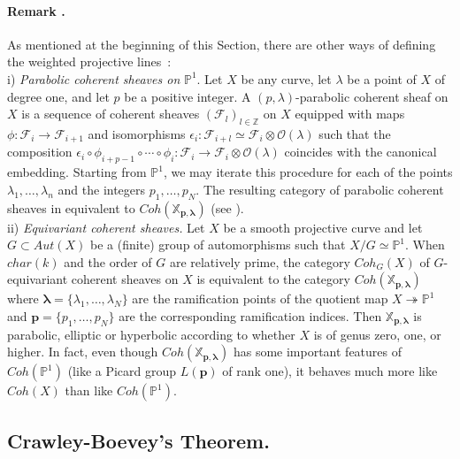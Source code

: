 \documentclass[a4paper,10pt]{amsart}
\def\Z{\mathbb{Z}}
\def\O{\mathcal{O}}
\def\p{\mathbf{p}}
\def\xpl{\mathbb{X}_{\mathbf{p},\boldsymbol{\lambda}}}
\def\llambda{\boldsymbol{\lambda}}
\numberwithin{equation}{section}
\begin{document}
{\paragraph{\textbf{Remark \thetheo.}} As mentioned at the beginning of this Section, there are other ways of defining the weighted projective lines~:\\
i) \textit{Parabolic coherent sheaves on} $\mathbb{P}^1$. Let $X$ be any curve, let $\lambda$ be a point of $X$ of degree one, and let $p$ be a positive integer. A $(p,\lambda)$-parabolic coherent sheaf on $X$ is a sequence of coherent sheaves $(\mathcal{F}_l)_{l \in \Z}$ on $X$ equipped with maps $\phi: \mathcal{F}_i \to \mathcal{F}_{i+1}$ and isomorphisms $\epsilon_i: \mathcal{F}_{i+l} \simeq \mathcal{F}_i \otimes \O(\lambda)$ such that the composition $\epsilon_i \circ \phi_{i+p-1} \circ \cdots \circ \phi_i : \mathcal{F}_i \to \mathcal{F}_i \otimes \O(\lambda)$ coincides with the canonical embedding. Starting from $\mathbb{P}^1$, we may iterate this procedure for each of the points $\lambda_1, \ldots, \lambda_n$ and the integers $p_1, \ldots, p_N$. The resulting category of parabolic coherent sheaves in equivalent to $Coh(\xpl)$ (see \cite{Lenzing1}).\\
ii) \textit{Equivariant coherent sheaves.} Let $X$ be a smooth projective curve and let $G \subset {Aut}(X)$ be a (finite) group of automorphisms such that $X/G \simeq \mathbb{P}^1$. When $char({k})$ and the order of $G$ are relatively prime, the category $Coh_G(X)$ of $G$-equivariant coherent sheaves on $X$ is equivalent to the category $Coh(\xpl)$ where $\llambda=\{\lambda_1, \ldots, \lambda_N\}$ are the ramification points of the quotient map $X \twoheadrightarrow \mathbb{P}^1$ and $\p=\{p_1, \ldots, p_N\}$ are the corresponding ramification indices. Then $\xpl$ is parabolic, elliptic or hyperbolic according to whether $X$ is of genus zero, one, or higher. In fact, even though $Coh(\xpl)$ has some important features of $Coh(\mathbb{P}^1)$ (like a Picard group $L(\p)$ of rank one), it behaves much more like $Coh(X)$ than like $Coh(\mathbb{P}^1)$.

\vspace{.2in}

\subsection{Crawley-Boevey's Theorem. }


}
\end{document}
